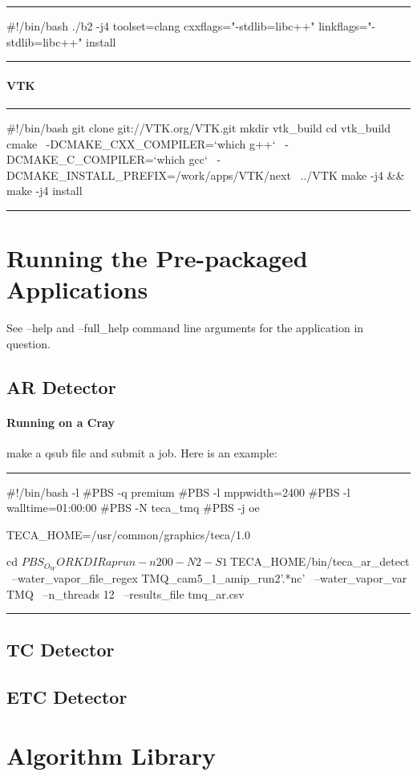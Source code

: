 \documentclass[a4paper,10pt,DIV=12]{scrreprt}
\newenvironment{code}{%
\center
\minipage{0.9\textwidth}
\hrule\vspace{2mm}
\small
\verbatim
}{%
\endverbatim
\vspace{-1mm}\hrule
\endminipage
\endcenter
}
\begin{document}
\begin{code}
#!/bin/bash
./b2 -j4 toolset=clang cxxflags="-stdlib=libc++" linkflags="-stdlib=libc++" install
\end{code}

\paragraph{VTK}
\begin{code}
#!/bin/bash
git clone git://VTK.org/VTK.git
mkdir vtk_build
cd vtk_build
cmake \
  -DCMAKE_CXX_COMPILER=`which g++` \
  -DCMAKE_C_COMPILER=`which gcc` \
  -DCMAKE_INSTALL_PREFIX=/work/apps/VTK/next \
  ../VTK
make -j4 && make -j4 install
\end{code}

\section{Running the Pre-packaged Applications}
See --help and --full\_help command line arguments for the application in question.

\subsection{AR Detector}
\paragraph{Running on a Cray}
make a qsub file and submit a job. Here is an example:
\begin{code}
#!/bin/bash -l
#PBS -q premium
#PBS -l mppwidth=2400
#PBS -l walltime=01:00:00
#PBS -N teca_tmq
#PBS -j oe

TECA_HOME=/usr/common/graphics/teca/1.0

cd $PBS_O_WORKDIR
aprun -n 200 -N 2 -S 1 \
    ${TECA_HOME}/bin/teca_ar_detect \
        --water_vapor_file_regex TMQ_cam5_1_amip_run2'.*nc' \
        --water_vapor_var TMQ \
        --n_threads 12 \
        --results_file tmq_ar.csv
\end{code}

\subsection{TC Detector}
\subsection{ETC Detector}
\section{Algorithm Library}
\end{document}
